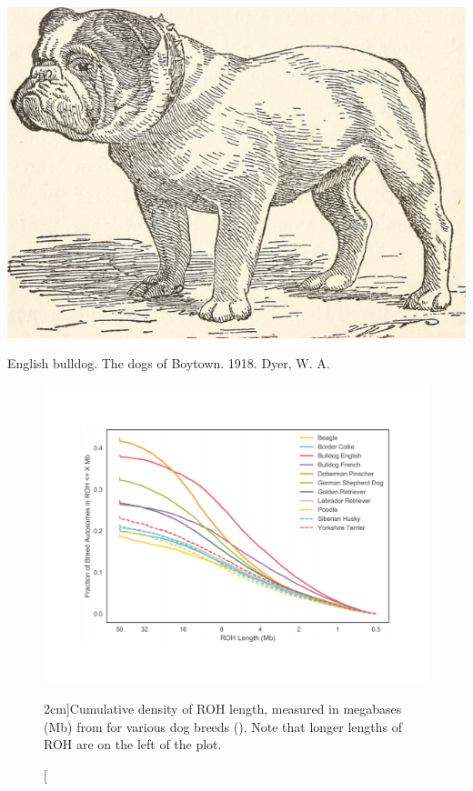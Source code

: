   \begin{marginfigure}[-3cm]
  \begin{center}
    \includegraphics[width=
    \textwidth]{illustration_images/alleles_genotypes/english_bulldog/14752595581_4330377c97_z.jpg}
\end{center}
\caption{English bulldog. The dogs of Boytown. 1918.  Dyer, W. A.} \label{fig:bulldog}
\end{marginfigure}
  \begin{figure}
  \begin{center}
    \includegraphics[width= \textwidth]{figures/sharing_relatives/dog_FROH_dist.pdf}
\end{center}
\caption[][2cm]{Cumulative density of ROH length, measured in megabases (Mb) from \citet{Sams:18} for various
  dog breeds (\PLOSccBY). Note that longer lengths of ROH are on the left of the plot.} \label{fig:dog_FOH_dist}
\end{figure}

